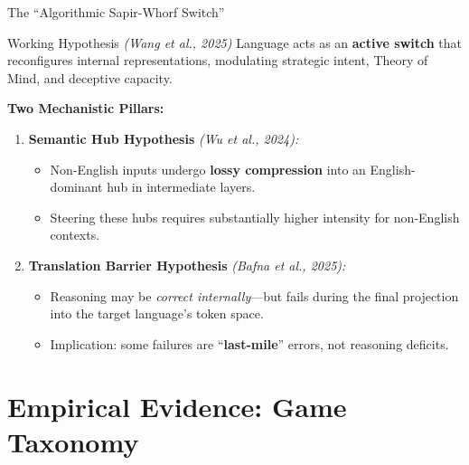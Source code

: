 \documentclass[11pt,aspectratio=169]{beamer}
\begin{document}
\begin{frame}{The ``Algorithmic Sapir-Whorf Switch''}
    \begin{block}{Working Hypothesis \textit{(Wang et al., 2025)}}
        Language acts as an \textbf{active switch} that reconfigures internal representations, modulating strategic intent, Theory of Mind, and deceptive capacity.
    \end{block}
    \vspace{0.3cm}
    \textbf{Two Mechanistic Pillars:}
    \begin{enumerate}
        \item \textbf{Semantic Hub Hypothesis} \textit{(Wu et al., 2024):}
        \begin{itemize}
            \item Non-English inputs undergo \textbf{lossy compression} into an English-dominant hub in intermediate layers.
            \item Steering these hubs requires substantially higher intensity for non-English contexts.
        \end{itemize}
        \vspace{0.2cm}
        \item \textbf{Translation Barrier Hypothesis} \textit{(Bafna et al., 2025):}
        \begin{itemize}
            \item Reasoning may be \textit{correct internally}---but fails during the final projection into the target language's token space.
            \item Implication: some failures are ``\textbf{last-mile}'' errors, not reasoning deficits.
        \end{itemize}
    \end{enumerate}
\end{frame}

\section{Empirical Evidence: Game Taxonomy}
\end{document}

